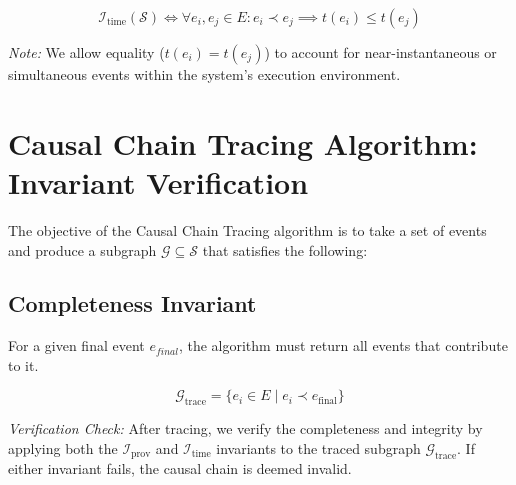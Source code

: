 \documentclass{article}
\begin{document}
\begin{equation}
\label{eq:temporal_monotonicity}
\mathcal{I}_{\text{time}}(\mathcal{S}) \iff \forall e_i, e_j \in E: e_i \prec e_j \implies t(e_i) \le t(e_j)
\end{equation}

\noindent \textit{Note:} We allow equality ($t(e_i) = t(e_j)$) to account for near-instantaneous or simultaneous events within the system's execution environment.

\section{Causal Chain Tracing Algorithm: Invariant Verification}

The objective of the Causal Chain Tracing algorithm is to take a set of events and produce a subgraph $\mathcal{G} \subseteq \mathcal{S}$ that satisfies the following:

\subsection{Completeness Invariant}
For a given final event $e_{final}$, the algorithm must return all events that contribute to it.

\begin{equation}
\label{eq:completeness_invariant}
\mathcal{G}_{\text{trace}} = \{e_i \in E \mid e_i \prec e_{\text{final}} \}
\end{equation}

\noindent \textit{Verification Check:} After tracing, we verify the completeness and integrity by applying both the $\mathcal{I}_{\text{prov}}$ and $\mathcal{I}_{\text{time}}$ invariants to the traced subgraph $\mathcal{G}_{\text{trace}}$. If either invariant fails, the causal chain is deemed invalid.
\end{document}
